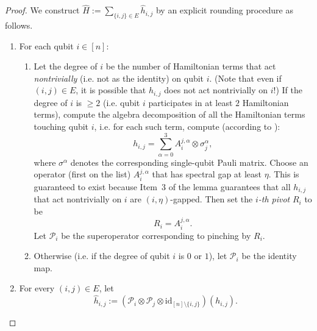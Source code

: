 \documentclass[11pt]{article}
\theoremstyle{plain}
\newcommand{\eps}{\varepsilon}
\begin{document}
\begin{proof}
 We construct $\hat{H} := \sum\limits_{\{i, j\} \in E} \hat{h}_{i,j} $ by an explicit rounding procedure as follows.
   
\begin{enumerate}

    \item For each qubit $i \in [n]$:

    \begin{enumerate}
    \item Let the degree of $i$ be the number of Hamiltonian terms that act \emph{nontrivially} (i.e. not as the identity) on qubit $i$. (Note that even if $(i,j) \in E$, it is possible that $h_{i,j}$ does not act nontrivially on $i$!) If the degree of $i$ is $\geq 2$ (i.e. qubit $i$ participates in at least $2$ Hamiltonian terms), compute the algebra decomposition of all the Hamiltonian terms touching qubit $i$, i.e. for each such term, compute (according to ):
    \[ h_{i,j} = \sum_{\alpha =0}^{3} A^{j, \alpha}_i \otimes \sigma^{\alpha}_j, \]
    where $\sigma^\alpha$ denotes the corresponding single-qubit Pauli matrix. Choose an operator (first on the list) $A^{j, \alpha}_i$ that has spectral gap at least $\eta$. This is guaranteed to exist because Item~3 of the lemma guarantees that all $h_{i,j}$ that act nontrivially on $i$ are $(i, \eta)$-gapped. Then set the \emph{$i$-th pivot} $R_i$ to be
    \[ R_i = A^{j, \alpha}_i.\]
    Let $\mathcal{P}_i$ be the superoperator corresponding to pinching by $R_i$.
    \item Otherwise (i.e. if the degree of qubit $i$ is $0$ or $1$), let $\mathcal{P}_i$ be the identity map.
    \end{enumerate}
    
    \item  For every $(i,j) \in E$, let
    \[ \hat{h}_{i,j} := (\mathcal{P}_i \otimes \mathcal{P}_j \otimes \mathrm{id}_{[n] \setminus \{i,j\}})(h_{i,j}). \]
\end{enumerate}


\end{proof}
\end{document}
